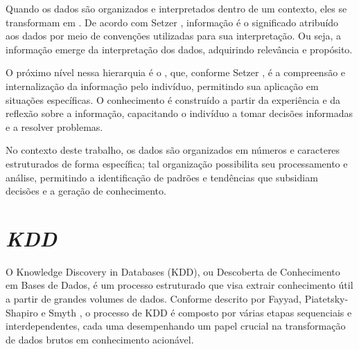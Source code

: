 Quando os dados são organizados e interpretados dentro de um contexto, eles se transformam em . De acordo com Setzer \cite{setzer1999dado}, informação é o significado atribuído aos dados por meio de convenções utilizadas para sua interpretação. Ou seja, a informação emerge da interpretação dos dados, adquirindo relevância e propósito.

O próximo nível nessa hierarquia é o , que, conforme Setzer \cite{setzer1999dado}, é a compreensão e internalização da informação pelo indivíduo, permitindo sua aplicação em situações específicas. O conhecimento é construído a partir da experiência e da reflexão sobre a informação, capacitando o indivíduo a tomar decisões informadas e a resolver problemas.

No contexto deste trabalho, os dados são organizados em números e caracteres estruturados de forma específica; tal organização possibilita seu processamento e análise, permitindo a identificação de padrões e tendências que subsidiam decisões e a geração de conhecimento.


\section{\textit{\acrfull{KDD}}}
O Knowledge Discovery in Databases (KDD), ou Descoberta de Conhecimento em Bases de Dados, é um processo estruturado que visa extrair conhecimento útil a partir de grandes volumes de dados. Conforme descrito por Fayyad, Piatetsky-Shapiro e Smyth \cite{fayyad1996data}, o processo de \acrshort{KDD} é composto por várias etapas sequenciais e interdependentes, cada uma desempenhando um papel crucial na transformação de dados brutos em conhecimento acionável.

